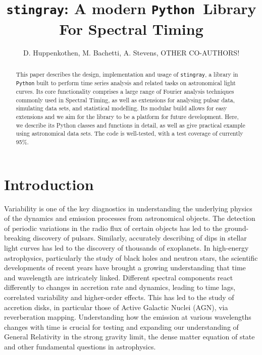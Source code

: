 \documentclass[12pt]{emulateapj}
\newcommand{\stingray}{\texttt{stingray}\xspace}
\newcommand{\python}{\texttt{Python}\xspace}
\begin{document}
\title{\stingray: A modern \python\ Library For Spectral Timing}

\author{D. Huppenkothen, M. Bachetti, A. Stevens\altaffilmark{}, OTHER CO-AUTHORS!}
 
\altaffiltext{}{}
\altaffiltext{}{}


\begin{abstract}
This paper describes the design, implementation and usage of \stingray, a library in \python built to perform time series analysis and related tasks on astronomical light curves. 
Its core functionality comprises a large range of Fourier analysis techniques commonly used in Spectral Timing, as well as extensions for analysing pulsar data, simulating data sets, and statistical modelling. 
Its modular build allows for easy extensions and we aim for the library to be a platform for future development. 
Here, we describe its Python classes and functions in detail, as well as give practical example using astronomical data sets. 
The code is well-tested, with a test coverage of currently 95\%.

\end{abstract}


\section{Introduction}

Variability is one of the key diagnostics in understanding the underlying physics of the dynamics and emission processes from astronomical objects. 
The detection of periodic variations in the radio flux of certain objects has led to the ground-breaking discovery of pulsars. Similarly, accurately describing of dips in stellar light curves has led to the discovery of thousands of exoplanets. 
In high-energy astrophysics, particularly the study of black holes and neutron stars, the scientific developments of recent years have brought a growing understanding that time and wavelength are intricately linked. 
Different spectral components react differently to changes in accretion rate and dynamics, leading to time lags, correlated variability and higher-order effects. 
This has led to the study of accretion disks, in particular those of Active Galactic Nuclei (AGN), via reverberation mapping. 
Understanding how the emission at various wavelengths changes with time is crucial for testing and expanding our understanding of General Relativity in the strong gravity limit, the dense matter equation of state and other fundamental questions in astrophysics.
\end{document}
